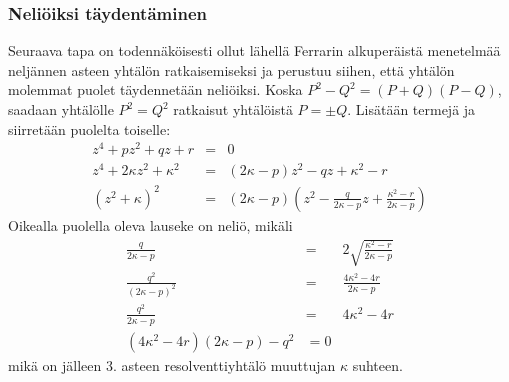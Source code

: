 \documentclass[a4paper]{article}
\begin{document}
\subsubsection{Neliöiksi täydentäminen}
Seuraava tapa on todennäköisesti ollut lähellä Ferrarin alkuperäistä menetelmää neljännen asteen yhtälön ratkaisemiseksi ja perustuu siihen, että yhtälön molemmat puolet täydennetään neliöiksi. Koska $P^2-Q^2=(P+Q)(P-Q)$, saadaan yhtälölle $P^2=Q^2$ ratkaisut yhtälöistä $P=\pm Q$. Lisätään termejä ja siirretään puolelta toiselle:
\begin{eqnarray*}
  z^4+pz^2+qz+r & = & 0 \\
  z^4+2\kappa z^2+\kappa^2 & = & (2\kappa-p) z^2-qz+\kappa^2-r \\
  \left(z^2+\kappa\right)^2 & = & \left(2\kappa-p\right)\left(z^2-\frac{q}{2\kappa -p}z+\frac{\kappa^2-r}{2\kappa -p}\right)
\end{eqnarray*}
Oikealla puolella oleva lauseke on neliö, mikäli
\begin{eqnarray*}
  \frac{q}{2\kappa -p} & = & 2\sqrt{\frac{\kappa^2-r}{2\kappa -p}} \\
  \frac{q^2}{(2\kappa -p)^2} & = & \frac{4\kappa^2-4r}{2\kappa -p} \\
  \frac{q^2}{2\kappa -p} & = & 4\kappa^2-4r \\
  (4\kappa^2-4r)(2\kappa -p)-q^2 & = 0
\end{eqnarray*}
mikä on jälleen 3. asteen resolventtiyhtälö muuttujan $\kappa$ suhteen.
\end{document}
